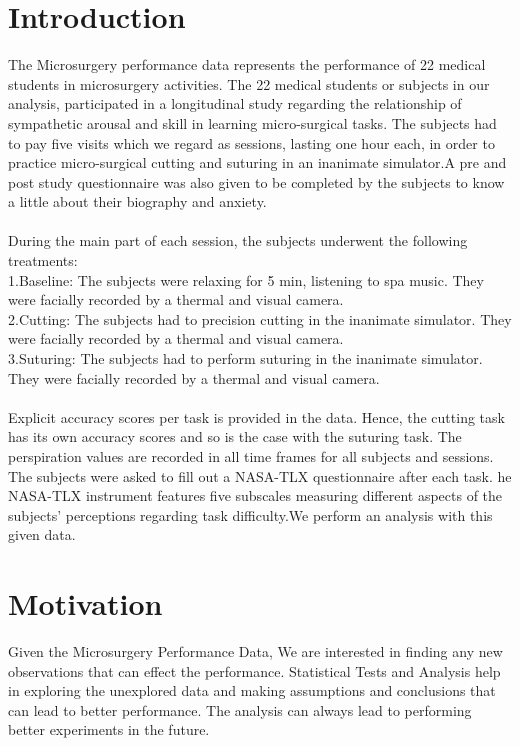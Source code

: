 \documentclass[12pt,epsf]{report}
\begin{document}
\section*{Introduction}
{The Microsurgery performance data represents the performance of 22 medical students in microsurgery activities. The 22 medical students or subjects in our analysis, participated in a longitudinal study regarding the relationship of sympathetic arousal and skill in learning micro-surgical tasks. The subjects had to pay five visits which we regard as sessions, lasting one hour each, in order to practice micro-surgical cutting and suturing in an inanimate simulator.A pre and post study questionnaire was also given to be completed by the subjects to know a little about their biography and anxiety.\\
\\
During the main part of each session, the subjects underwent the following treatments:\\
1.Baseline: The subjects were relaxing for 5 min, listening to spa music. They were facially recorded by a thermal and visual camera.\\
2.Cutting: The subjects had to precision cutting in the inanimate simulator. They were facially recorded by a thermal and visual camera.\\
3.Suturing: The subjects had to perform suturing in the inanimate simulator. They were facially recorded by a thermal and visual camera.\\
\\
Explicit accuracy scores per task is provided in the data. Hence, the cutting task has its own accuracy scores and so is the case with the suturing task. The perspiration values are recorded in all time frames for all subjects and sessions. The subjects were asked to fill out a  NASA-TLX questionnaire after each task. he NASA-TLX instrument features five subscales measuring different aspects of the subjects' perceptions regarding task difficulty.We perform an analysis with this given data.\\   }
\section*{Motivation}
Given the Microsurgery Performance Data, We are interested in finding any new observations that can effect the performance. Statistical Tests and Analysis help in exploring the unexplored data and making assumptions and conclusions that can lead to better performance. The analysis can always lead to performing better experiments in the future.\\
\end{document}
